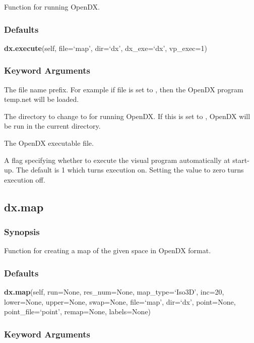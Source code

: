 Function for running OpenDX.

\subsubsection{Defaults}

\textsf{\textbf{dx.execute}(self, file=`map', dir=`dx', dx\_exe=`dx', vp\_exec=1)}


\subsubsection{Keyword Arguments}


  The file name prefix.  For example if file is set to 
, then the OpenDX  program temp.net will be loaded.

  The directory to change to for running OpenDX.   If this is set to 
, OpenDX  will be run in the current directory.

  The OpenDX  executable file.

  A flag specifying whether to execute the visual program automatically at start-up.  The default is 1 which turns execution on.  Setting the value to zero turns execution off.


\newpage

\subsection{dx.map}


\subsubsection{Synopsis}

Function for creating a map of the given space in OpenDX format.

\subsubsection{Defaults}

\textsf{\textbf{dx.map}(self, run=None, res\_num=None, map\_type=`Iso3D', inc=20, lower=None, upper=None, swap=None, file=`map', dir=`dx', point=None, point\_file=`point', remap=None, labels=None)}


\subsubsection{Keyword Arguments}


